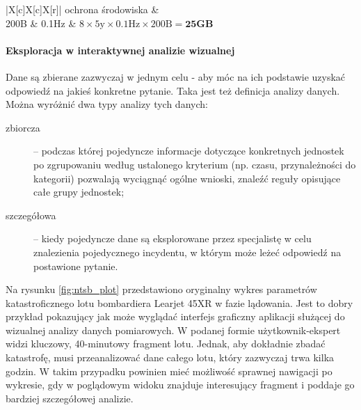 \begin{table}[H]
\begin{tabu}{|X[c]X[c]X[r]|}
		ochrona środowiska                   &                                                                                \\
		200B                                 & 0.1Hz                                                       & $8 \times 5\mbox{y} \times 0.1\mbox{Hz} \times 200\mbox{B} = \textbf{25GB}$       \\ \hline
	\end{tabu}
	\caption{Przykłady danych pomiarowych}
	\label{table:measurementDataExamples}
\end{table}

\paragraph{Eksploracja w interaktywnej analizie wizualnej}
Dane są zbierane zazwyczaj w jednym celu - aby móc na ich podstawie uzyskać odpowiedź na jakieś konkretne pytanie. Taka jest też definicja analizy danych.
Można wyróżnić dwa typy analizy tych danych:
\begin{description}
	\item[zbiorcza]-- podczas której pojedyncze informacje dotyczące konkretnych jednostek po zgrupowaniu według ustalonego kryterium (np. czasu, przynależności do kategorii) pozwalają wyciągnąć ogólne wnioski, znaleźć reguły opisujące całe grupy jednostek;
	
	\item[szczegółowa]-- kiedy pojedyncze dane są eksplorowane przez specjalistę w celu znalezienia pojedycznego incydentu, w którym może leżeć odpowiedź na postawione pytanie.
\end{description}

Na rysunku \ref{fig:ntsb_plot} przedstawiono oryginalny wykres parametrów katastroficznego lotu bombardiera Learjet 45XR w fazie lądowania.
Jest to dobry przykład pokazujący jak może wyglądać interfejs graficzny aplikacji służącej do wizualnej analizy danych pomiarowych.
W podanej formie użytkownik-ekspert widzi kluczowy, 40-minutowy fragment lotu.
Jednak, aby dokładnie zbadać katastrofę, musi przeanalizować dane całego lotu, który zazwyczaj trwa kilka godzin.
W takim przypadku powinien mieć możliwość sprawnej nawigacji po wykresie, gdy w poglądowym widoku znajduje interesujący fragment i poddaje go bardziej szczegółowej analizie.

